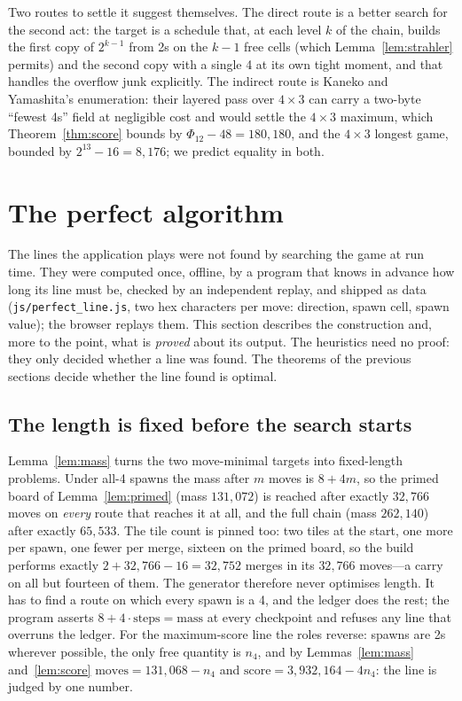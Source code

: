 \documentclass[11pt]{article}
\theoremstyle{definition}
\theoremstyle{remark}
\newcommand{\nfour}{n_4}
\newcommand{\mass}{\mathrm{mass}}
\begin{document}
Two routes to settle it suggest themselves. The direct route is a better
search for the second act: the target is a schedule that, at each level
$k$ of the chain, builds the first copy of $2^{k-1}$ from 2s on the $k-1$
free cells (which Lemma~\ref{lem:strahler} permits) and the second copy
with a single 4 at its own tight moment, and that handles the overflow
junk explicitly. The indirect route is Kaneko and Yamashita's enumeration:
their layered pass over $4\times3$ can carry a two-byte ``fewest 4s''
field at negligible cost and would settle the $4\times3$ maximum, which
Theorem~\ref{thm:score} bounds by $\Phi_{12}-48=180{,}180$, and the
$4\times3$ longest game, bounded by $2^{13}-16=8{,}176$; we predict
equality in both.

\section{The perfect algorithm}\label{sec:algorithm}

The lines the application plays were not found by searching the game at
run time. They were computed once, offline, by a program that knows in
advance how long its line must be, checked by an independent replay, and
shipped as data (\texttt{js/perfect\_line.js}, two hex characters per
move: direction, spawn cell, spawn value); the browser replays them. This
section describes the construction and, more to the point, what is
\emph{proved} about its output. The heuristics need no proof: they only
decided whether a line was found. The theorems of the previous sections
decide whether the line found is optimal.

\subsection{The length is fixed before the search starts}

Lemma~\ref{lem:mass} turns the two move-minimal targets into fixed-length
problems. Under all-4 spawns the mass after $m$ moves is $8+4m$, so the
primed board of Lemma~\ref{lem:primed} (mass $131{,}072$) is reached after
exactly $32{,}766$ moves on \emph{every} route that reaches it at all, and
the full chain (mass $262{,}140$) after exactly $65{,}533$. The tile count
is pinned too: two tiles at the start, one more per spawn, one fewer per
merge, sixteen on the primed board, so the build performs exactly
$2+32{,}766-16=32{,}752$ merges in its $32{,}766$ moves---a carry on
all but fourteen of them. The generator
therefore never optimises length. It has to find a route on which every
spawn is a 4, and the ledger does the rest; the program asserts
$8+4\cdot\text{steps}=\mass$ at every checkpoint and refuses any line that
overruns the ledger. For the maximum-score line the roles reverse: spawns
are 2s wherever possible, the only free quantity is $\nfour$, and by
Lemmas~\ref{lem:mass} and~\ref{lem:score}
$\text{moves}=131{,}068-\nfour$ and $\text{score}=3{,}932{,}164-4\nfour$:
the line is judged by one number.
\end{document}
